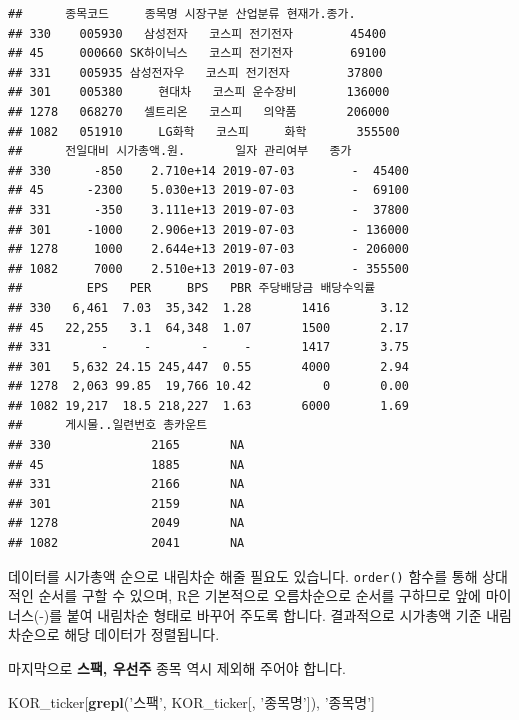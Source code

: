 \documentclass[12pt,]{book}
\newenvironment{Shaded}{\begin{snugshade}}{\end{snugshade}}
\newcommand{\KeywordTok}[1]{\textcolor[rgb]{0.13,0.29,0.53}{\textbf{#1}}}
\newcommand{\NormalTok}[1]{#1}
\newcommand{\StringTok}[1]{\textcolor[rgb]{0.31,0.60,0.02}{#1}}
\begin{document}
\begin{verbatim}
##      종목코드     종목명 시장구분 산업분류 현재가.종가.
## 330    005930   삼성전자   코스피 전기전자        45400
## 45     000660 SK하이닉스   코스피 전기전자        69100
## 331    005935 삼성전자우   코스피 전기전자        37800
## 301    005380     현대차   코스피 운수장비       136000
## 1278   068270   셀트리온   코스피   의약품       206000
## 1082   051910     LG화학   코스피     화학       355500
##      전일대비 시가총액.원.       일자 관리여부   종가
## 330      -850    2.710e+14 2019-07-03        -  45400
## 45      -2300    5.030e+13 2019-07-03        -  69100
## 331      -350    3.111e+13 2019-07-03        -  37800
## 301     -1000    2.906e+13 2019-07-03        - 136000
## 1278     1000    2.644e+13 2019-07-03        - 206000
## 1082     7000    2.510e+13 2019-07-03        - 355500
##         EPS   PER     BPS   PBR 주당배당금 배당수익률
## 330   6,461  7.03  35,342  1.28       1416       3.12
## 45   22,255   3.1  64,348  1.07       1500       2.17
## 331       -     -       -     -       1417       3.75
## 301   5,632 24.15 245,447  0.55       4000       2.94
## 1278  2,063 99.85  19,766 10.42          0       0.00
## 1082 19,217  18.5 218,227  1.63       6000       1.69
##      게시물..일련번호 총카운트
## 330              2165       NA
## 45               1885       NA
## 331              2166       NA
## 301              2159       NA
## 1278             2049       NA
## 1082             2041       NA
\end{verbatim}

데이터를 시가총액 순으로 내림차순 해줄 필요도 있습니다. \texttt{order()} 함수를 통해 상대적인 순서를 구할 수 있으며, R은 기본적으로 오름차순으로 순서를 구하므로 앞에 마이너스(-)를 붙여 내림차순 형태로 바꾸어 주도록 합니다. 결과적으로 시가총액 기준 내림차순으로 해당 데이터가 정렬됩니다.

마지막으로 \textbf{스팩, 우선주} 종목 역시 제외해 주어야 합니다.

\begin{Shaded}
\begin{Highlighting}[]
\NormalTok{KOR_ticker[}\KeywordTok{grepl}\NormalTok{(}\StringTok{'스팩'}\NormalTok{, KOR_ticker[, }\StringTok{'종목명'}\NormalTok{]), }\StringTok{'종목명'}\NormalTok{]  }
\end{Highlighting}
\end{Shaded}
\end{document}
